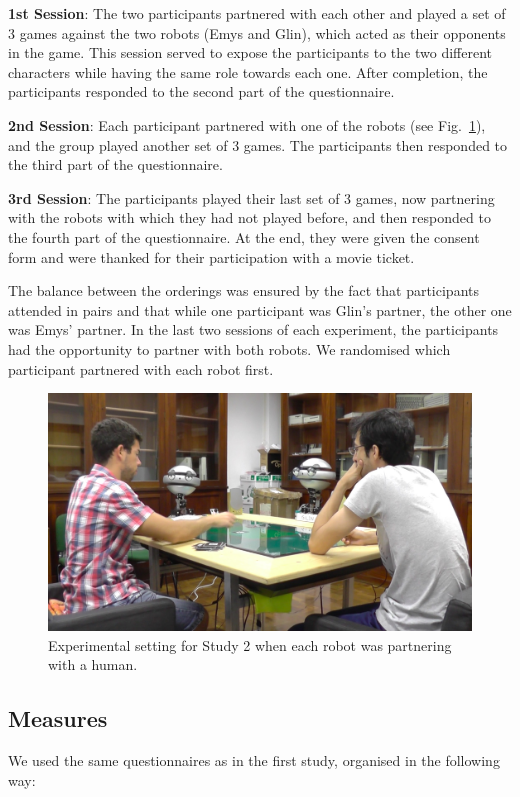 \textbf{1st Session}: The two participants partnered with each other and played a set of 3 games against the two robots (Emys and Glin), which acted as their opponents in the game. This session served to expose the participants to the two different characters while having the same role towards each one. After completion, the participants responded to the second part of the questionnaire.

\textbf{2nd Session}: Each participant partnered with one of the robots (see Fig.~\ref{study2-session2-3}), and the group played another set of 3 games. The participants then responded to the third part of the questionnaire.

\textbf{3rd Session}: The participants played their last set of 3 games, now partnering with the robots with which they had not played before, and then responded to the fourth part of the questionnaire. At the end, they were given the consent form and were thanked for their participation with a movie ticket.

The balance between the orderings was ensured by the fact that participants attended in pairs and that while one participant was Glin's partner, the other one was Emys' partner. In the last two sessions of each experiment, the participants had the opportunity to partner with both robots. We randomised which participant partnered with each robot first.

\begin{figure}[ht]
\centering
 \includegraphics[width=0.7\columnwidth]{images/membership/study2}
\caption{Experimental setting for Study 2 when each robot was partnering with a human.}
 \label{study2-session2-3}
\end{figure}


\subsection{Measures}
We used the same questionnaires as in the first study, organised in the following way:


